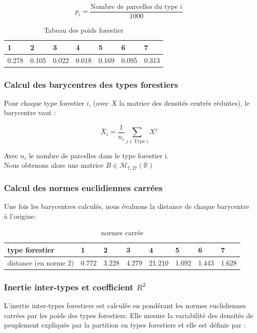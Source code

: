 \documentclass{article}
\begin{document}
\[
p_i = \frac{\text{Nombre de parcelles du type } i}{1000}
\]

\begin{table}[H]
    \center
    \begin{tabular}{|l|l|l|l|l|l|l|}
    \hline
    1     & 2     & 3     & 4     & 5     & 6     & 7     \\ \hline
    0.278 & 0.105 & 0.022 & 0.018 & 0.169 & 0.095 & 0.313 \\ \hline
    \end{tabular}
    \caption{Tabeau des poids forestier}
    \end{table}


\subsubsection{Calcul des barycentres des types forestiers}
Pour chaque type forestier $i$,  (avec $X$ la matrice des densités centrés réduites), le barycentre vaut :

\[
\bar{X}_i = \frac{1}{n_i} \sum_{j \in \text{Type } i} X^j
\]

Avec $n_i$ le nombre de parcelles dans le type forestier i.
\\
Nous obtenons alors une matrice $B \in \mathcal{M}_{7,27}(\mathbb{R})$


\subsubsection{Calcul des normes euclidiennes carrées}
Une fois les barycentres calculés, nous évaluons la distance de chaque barycentre à l'origine:

\begin{table}[H]
    \begin{tabular}{|l|l|l|l|l|l|l|l|}
    \hline
    type forestier       & 1         & 2         & 3         & 4      & 5     & 6     & 7     \\ \hline
    distance (en norme 2) & 0.772 & 3.228 & 4.279 & 21.210 & 1.092 & 1.443 & 1.628 \\ \hline
    \end{tabular}
    \caption{normes carrée}
    \end{table}

\subsubsection{Inertie inter-types et coefficient $R^2$}


L'inertie inter-types forestiers est calculée en pondérant les normes euclidiennes carrées par les poids des types forestiers. Elle mesure la variabilité des densités de peuplement expliquée par la partition en types forestiers et elle est définie par :
\end{document}
